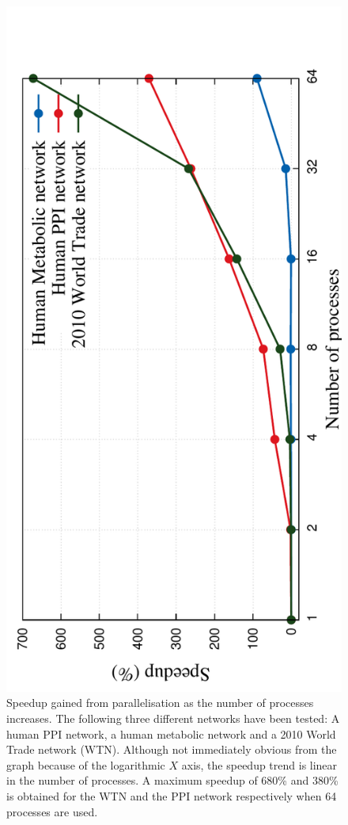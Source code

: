 \begin{figure}[H]
  \centering
\includegraphics[angle=-90,scale=0.6]{../code/final_results/parallelisation_results/nr_processes2}
\caption[Parallelisation - speedup for PPI, Metabolic and 2010 WTN networks]{Speedup gained from parallelisation as the number of processes increases. The following three different networks have been tested: A human PPI network, a human metabolic network and a 2010 World Trade network (WTN). Although not immediately obvious from the graph because of the logarithmic $X$ axis, the speedup trend is linear in the number of processes. A maximum speedup of 680\% and 380\% is obtained for the WTN and the PPI network respectively when 64 processes are used.}
\label{fig:time_threads}
\end{figure}

